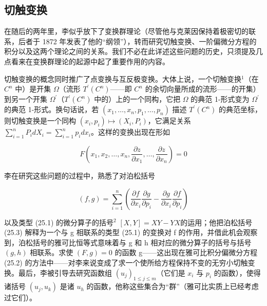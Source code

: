 \subsection{切触变换}

在随后的两年里，李似乎放下了变换群理论（尽管他与克莱因保持着极密切的联系，后者于 1872 年发表了他的“纲领”），转而研究切触变换、一阶偏微分方程的积分以及这两个理论之间的关系。我们不必在此详述这些问题的历史，只须提及几点看来在变换群理论的起源中起了重要作用的内容。

切触变换的概念同时推广了点变换与互反极变换。大体上说，一个切触变换\(^{1}\)（在 \(C^{n}\) 中）是开集 \(\Omega\)（流形 \(T^{\prime}(C^{n})\)——即 \(C^{n}\) 的余切向量所成的流形——的开集）到另一个开集 \(\Omega^{\prime}\)（\(T^{\prime}(C^{n})\) 中的）上的一个同构，它把 \(\Omega\) 的典范 1-形式变为 \(\Omega^{\prime}\) 的典范 1-形式。换句话说，若 \((x_{1},\ldots,x_{n},p_{1},\ldots,p_{n})\) 描述 \(T^{\prime}(C^{n})\) 的典范坐标，则切触变换是一个同构 \((x_{i},p_{i})\mapsto(X_{i},P_{i})\)，它满足关系 \(\sum_{i=1}^{n}P_{i}dX_{i}=\sum_{i=1}^{n}p_{i}dx_{i}\)。这样的变换出现在形如

\[
F \left(x _ {1}, x _ {2}, \dots , x _ {n}, \frac {\partial z}{\partial x _ {1}}, \dots , \frac {\partial z}{\partial x _ {n}}\right) = 0\tag{25.2}
\]

李在研究这些问题的过程中，熟悉了对泊松括号

\[
(f, g) = \sum_ {i = 1} ^ {n} \left(\frac {\partial f}{\partial x _ {i}} \frac {\partial g}{\partial p _ {i}} - \frac {\partial g}{\partial x _ {i}} \frac {\partial f}{\partial p _ {i}}\right)\tag{25.3}
\]

以及类型 (25.1) 的微分算子的括号\(^{2}\) \([X,Y]=XY-YX\)的运用；他把泊松括号 (25.3) 解释为一个与 g 相联系的类型 (25.1) 的变换对 f 的作用，并借此机会观察到，泊松括号的雅可比恒等式意味着与 g 和 h 相对应的微分算子的括号与括号 \((g,h)\) 相联系。求使 \((F,g)=0\) 的函数 g——这出现在雅可比积分偏微分方程 (25.2) 的方法中——对李来说变成了求一个使所给方程保持不变的无穷小切触变换。最后，李被引导去研究函数组 \((u_{j})_{1\leq j\leq m}\)（它们是 \(x_{i}\) 与 \(p_{i}\) 的函数），使得诸括号 \((u_{j},u_{k})\) 是诸 \(u_{h}\) 的函数，他称这些集合为“群”（雅可比实质上已经考虑过它们）。

